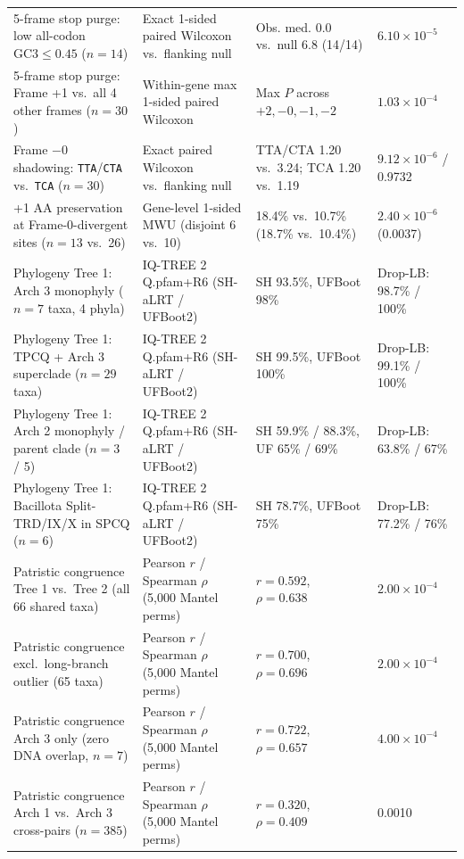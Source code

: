 \documentclass[10pt,letterpaper]{article}
\begin{document}
{\begin{longtable}{@{}p{}p{}p{}p{}@{}}
5-frame stop purge: low all-codon $\text{GC3} \le 0.45$ ($n=14$) & Exact 1-sided paired Wilcoxon vs.\ flanking null & Obs. med. 0.0 vs.\ null 6.8 (14/14) & $6.10 \times 10^{-5}$ \\
5-frame stop purge: Frame +1 vs.\ all 4 other frames ($n=30$) & Within-gene max 1-sided paired Wilcoxon & Max $P$ across $+2, -0, -1, -2$ & $1.03 \times 10^{-4}$ \\
Frame $-0$ shadowing: \texttt{TTA}/\texttt{CTA} vs.\ \texttt{TCA} ($n=30$) & Exact paired Wilcoxon vs.\ flanking null & TTA/CTA 1.20 vs.\ 3.24; TCA 1.20 vs.\ 1.19 & $9.12 \times 10^{-6}$ / 0.9732 \\
+1 AA preservation at Frame-0-divergent sites ($n=13$ vs.\ 26) & Gene-level 1-sided MWU (disjoint 6 vs.\ 10) & 18.4\% vs.\ 10.7\% (18.7\% vs.\ 10.4\%) & $2.40 \times 10^{-6}$ (0.0037) \\
Phylogeny Tree 1: Arch 3 monophyly ($n=7$ taxa, 4 phyla) & IQ-TREE 2 Q.pfam+R6 (SH-aLRT / UFBoot2) & SH 93.5\%, UFBoot 98\% & Drop-LB: 98.7\% / 100\% \\
Phylogeny Tree 1: TPCQ + Arch 3 superclade ($n=29$ taxa) & IQ-TREE 2 Q.pfam+R6 (SH-aLRT / UFBoot2) & SH 99.5\%, UFBoot 100\% & Drop-LB: 99.1\% / 100\% \\
Phylogeny Tree 1: Arch 2 monophyly / parent clade ($n=3$ / 5) & IQ-TREE 2 Q.pfam+R6 (SH-aLRT / UFBoot2) & SH 59.9\% / 88.3\%, UF 65\% / 69\% & Drop-LB: 63.8\% / 67\% \\
Phylogeny Tree 1: Bacillota Split-TRD/IX/X in SPCQ ($n=6$) & IQ-TREE 2 Q.pfam+R6 (SH-aLRT / UFBoot2) & SH 78.7\%, UFBoot 75\% & Drop-LB: 77.2\% / 76\% \\
Patristic congruence Tree 1 vs.\ Tree 2 (all 66 shared taxa) & Pearson $r$ / Spearman $\rho$ (5,000 Mantel perms) & $r = 0.592$, $\rho = 0.638$ & $2.00 \times 10^{-4}$ \\
Patristic congruence excl.\ long-branch outlier (65 taxa) & Pearson $r$ / Spearman $\rho$ (5,000 Mantel perms) & $r = 0.700$, $\rho = 0.696$ & $2.00 \times 10^{-4}$ \\
Patristic congruence Arch 3 only (zero DNA overlap, $n=7$) & Pearson $r$ / Spearman $\rho$ (5,000 Mantel perms) & $r = 0.722$, $\rho = 0.657$ & $4.00 \times 10^{-4}$ \\
Patristic congruence Arch 1 vs.\ Arch 3 cross-pairs ($n=385$) & Pearson $r$ / Spearman $\rho$ (5,000 Mantel perms) & $r = 0.320$, $\rho = 0.409$ & 0.0010 \\
\end{longtable}
}
\end{document}
